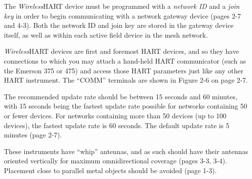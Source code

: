 







The {\sl Wireless}HART device must be programmed with a {\it network ID} and a {\it join key} in order to begin communicating with a network gateway device (pages 2-7 and 4-3).  Both the network ID and join key are stored in the gateway device itself, as well as within each active field device in the mesh network.

\vskip 10pt

{\sl Wireless}HART devices are first and foremost HART devices, and so they have connections to which you may attach a hand-held HART communicator (such as the Emerson 375 or 475) and access those HART parameters just like any other HART instrument.  The ``COMM'' terminals are shown in Figure 2-6 on page 2-7.

\vskip 10pt

The recommended update rate should be between 15 seconds and 60 minutes, with 15 seconds being the fastest update rate possible for networks containing 50 or fewer devices.  For networks containing more than 50 devices (up to 100 devices), the fastest update rate is 60 seconds.  The default update rate is 5 minutes (page 2-7).

\vskip 10pt

These instruments have ``whip'' antennas, and as such should have their antennas oriented vertically for maximum omnidirectional coverage (pages 3-3, 3-4).  Placement close to parallel metal objects should be avoided (page 1-3).



